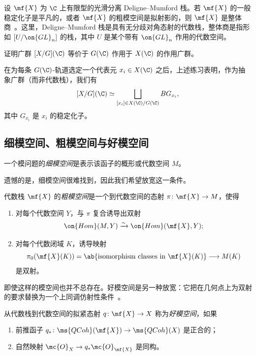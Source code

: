 \begin{exm}
    设 \(\mf{X}\) 为 \(\C\) 上有限型的光滑分离 Deligne–Mumford 栈。若 \(\mf{X}\) 的一般稳定化子是平凡的，或者 \(\mf{X}\) 的粗模空间是拟射影的，则 \(\mf{X}\) 是整体商~\cite{EHKV2001}。这里，Deligne–Mumford 栈是具有无分歧对角态射的代数栈，整体商是指形如 \([U/\on{GL}_n]\) 的栈，其中 \(U\) 是某个带有 \(\on{GL}_n\) 作用的代数空间。
\end{exm}

\begin{exer}
    证明广群 \([X/G](\C)\) 等价于 \(G(\C)\) 作用于 \(X(\C)\) 的作用广群。
\end{exer}

在为每条 \(G(\C)\)-轨道选定一个代表元 \(x_i\in X(\C)\) 之后，上述练习表明，作为抽象广群（而非代数栈），我们有
\[ 
    [X/G](\C) \simeq \bigsqcup_{[x_i] \in X(\C)/G(\C)} BG_{x_i}, 
\]
其中 \(G_{x_i}\) 是 \(x_i\) 的稳定化子。


\subsection{细模空间、粗模空间与好模空间}%
\label{sub:Fine vs coarse vs good moduli spaces}

\begin{defn}
    一个模问题的\textit{细模空间}是表示该函子的概形或代数空间 \(M\)。 
\end{defn}

遗憾的是，细模空间很难找到，因此我们希望放宽这一条件。

\begin{defn}
    代数栈 \(\mf{X}\) 的\textit{粗模空间}是一个到代数空间的态射 \(\pi\colon\mf{X}\to M\)，使得
    \begin{enumerate}
        \item 对每个代数空间 \(Y\)，与 \(\pi\) 复合诱导出双射
        \[
            \on{Hom}(M,Y)\xrightarrow{\sim}\on{Hom}(\mf{X},Y);
        \]
        \item 对每个代数闭域 \(K\)，诱导映射
        \[
            \pi_0(\mf{X}(K))=\ab\{\text{isomorphism classes in }\mf{X}(K)\}
            \longrightarrow M(K)
        \]
        是双射。
    \end{enumerate}
\end{defn}


即使这样的模空间也并不总存在。好模空间是另一种放宽：它把在几何点上为双射的要求替换为一个上同调仿射性条件~\cite{Alper2013}。

\begin{defn}
    从代数栈到代数空间的拟紧态射 \(q\colon\mf{X}\to X\) 称为\textit{好模空间}，如果
    \begin{enumerate}
        \item 前推函子 \(q_*\colon\ms{QCoh}(\mf{X})\to\ms{QCoh}(X)\) 是正合的；
        \item 自然映射 \(\mc{O}_X\to q_*\mc{O}_{\mf{X}}\) 是同构。
    \end{enumerate}
\end{defn}

